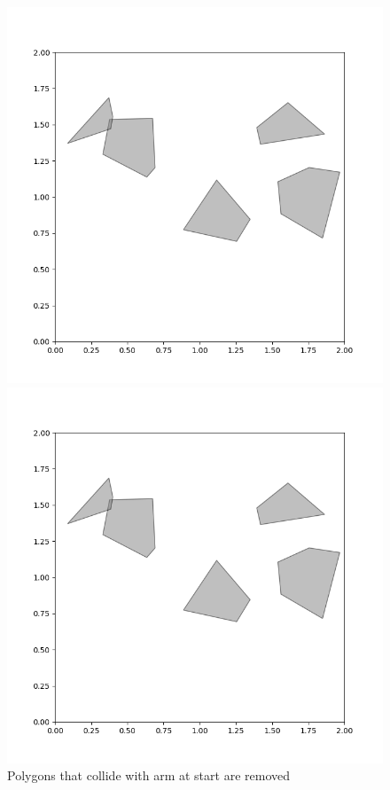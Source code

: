 \documentclass{article}
\begin{document}
\begin{figure}[H]
  \centering
  \begin{minipage}{0.45\textwidth}
    \includegraphics[scale = 0.3]{part4_visualization.png}
  \end{minipage}\hfill
  \begin{minipage}{0.45\textwidth}
    \includegraphics[width=\linewidth]{part4_visualization.png}
  \end{minipage}
    \caption{Polygons that collide with arm at start are removed}
\end{figure}
\end{document}
